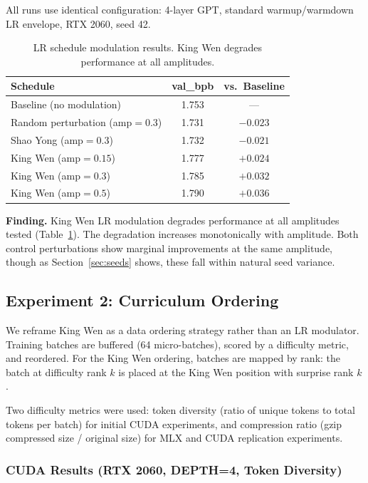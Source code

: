 \documentclass{article}
\begin{document}
All runs use identical configuration: 4-layer GPT, standard warmup/warmdown LR envelope, RTX 2060, seed 42.

\begin{table}[h]
\centering
\begin{tabular}{lcc}
\toprule
\textbf{Schedule} & \textbf{val\_bpb} & \textbf{vs.\ Baseline} \\
\midrule
Baseline (no modulation) & 1.753 & --- \\
Random perturbation (amp${}=0.3$) & 1.731 & $-0.023$ \\
Shao Yong (amp${}=0.3$) & 1.732 & $-0.021$ \\
King Wen (amp${}=0.15$) & 1.777 & $+0.024$ \\
King Wen (amp${}=0.3$) & 1.785 & $+0.032$ \\
King Wen (amp${}=0.5$) & 1.790 & $+0.036$ \\
\bottomrule
\end{tabular}
\caption{LR schedule modulation results. King Wen degrades performance at all amplitudes.}
\label{tab:lr}
\end{table}

\textbf{Finding.} King Wen LR modulation degrades performance at all amplitudes tested (Table~\ref{tab:lr}). The degradation increases monotonically with amplitude. Both control perturbations show marginal improvements at the same amplitude, though as Section~\ref{sec:seeds} shows, these fall within natural seed variance.

\subsection{Experiment 2: Curriculum Ordering}

We reframe King Wen as a data ordering strategy rather than an LR modulator. Training batches are buffered (64 micro-batches), scored by a difficulty metric, and reordered. For the King Wen ordering, batches are mapped by rank: the batch at difficulty rank $k$ is placed at the King Wen position with surprise rank $k$.

Two difficulty metrics were used: token diversity (ratio of unique tokens to total tokens per batch) for initial CUDA experiments, and compression ratio (gzip compressed size / original size) for MLX and CUDA replication experiments.

\subsubsection{CUDA Results (RTX 2060, DEPTH=4, Token Diversity)}
\end{document}

